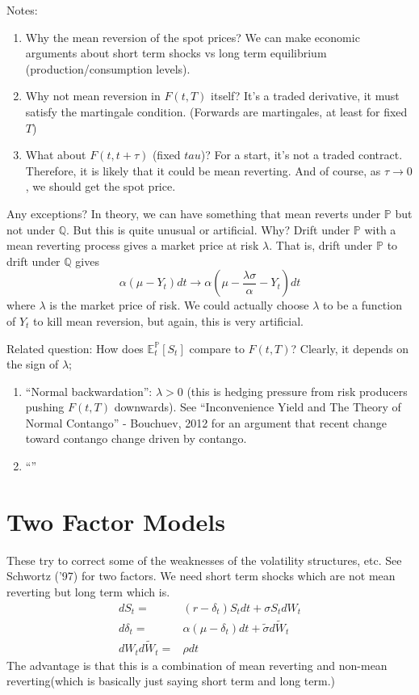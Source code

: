 \documentclass[twocolumn,openany]{book}
\begin{document}
Notes:
\begin{enumerate}
	\item Why the mean reversion of the spot prices? We can make economic arguments about short term shocks vs long term equilibrium (production/consumption levels).
	
	\item Why not mean reversion in $F(t,T)$ itself? It's a traded derivative, it must satisfy the martingale condition. (Forwards are martingales, at least for fixed $T$) 
	
	\item What about $F(t,t+\tau)$ (fixed $tau$)? For a start, it's not a traded contract. Therefore, it is likely that it could be mean reverting. And of course, as $\tau \to 0$, we should get the spot price.
	
\end{enumerate}

Any exceptions? In theory, we can have something that mean reverts under $\mathbb{P}$ but not under $\mathbb{Q}$. But this is quite unusual or artificial. Why? Drift under $\mathbb{P}$ with a mean reverting process gives a market price at risk $\lambda$. That is, drift under $\mathbb{P}$ to drift under $\mathbb{Q}$ gives
\begin{equation}
	\alpha (\mu - Y_t)dt \to \alpha (\mu - \frac{\lambda \sigma}{\alpha} - Y_t)dt
\end{equation}
where $\lambda$ is the market price of risk.
We could actually choose $\lambda$ to be a function of $Y_t$ to kill mean reversion, but again, this is very artificial.

Related question: How does $\mathbb{E}^\mathbb{P}_t\left[ S_t\right]$ compare to $F(t,T)$? Clearly, it depends on the sign of $\lambda$;
\begin{enumerate}
	\item ``Normal backwardation'': $\lambda > 0$ (this is hedging pressure from risk producers pushing $F(t,T)$ downwards). See ``Inconvenience Yield and The Theory of Normal Contango'' -  Bouchuev, 2012 for an argument that recent change toward contango change driven by contango.
	\item ``''
\end{enumerate}


\section{Two Factor Models}
These try to correct some of the weaknesses of the volatility structures, etc. See Schwortz ('97) for two factors. We need short term shocks which are not mean reverting but long term which is.
\begin{align}
	dS_t =& (r-\delta_t) S_t dt + \sigma S_t dW_t\\
	d\delta_t =& \alpha(\mu - \delta_t)dt + \tilde{\sigma} d\tilde{W}_t\\
	dW_t d\tilde{W}_t =& \rho dt
\end{align}
The advantage is that this is a combination of mean reverting and non-mean reverting(which is basically just saying short term and long term.)
\end{document}
